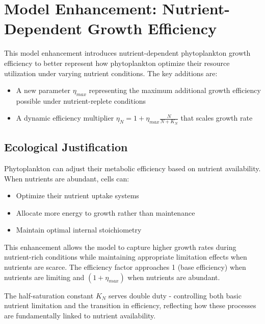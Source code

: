 \section{Model Enhancement: Nutrient-Dependent Growth Efficiency}

This model enhancement introduces nutrient-dependent phytoplankton growth efficiency to better represent how phytoplankton optimize their resource utilization under varying nutrient conditions. The key additions are:

\begin{itemize}
    \item A new parameter $\eta_{max}$ representing the maximum additional growth efficiency possible under nutrient-replete conditions
    \item A dynamic efficiency multiplier $\eta_N = 1 + \eta_{max} \frac{N}{N + K_N}$ that scales growth rate
\end{itemize}

\subsection{Ecological Justification}

Phytoplankton can adjust their metabolic efficiency based on nutrient availability. When nutrients are abundant, cells can:
\begin{itemize}
    \item Optimize their nutrient uptake systems
    \item Allocate more energy to growth rather than maintenance
    \item Maintain optimal internal stoichiometry
\end{itemize}

This enhancement allows the model to capture higher growth rates during nutrient-rich conditions while maintaining appropriate limitation effects when nutrients are scarce. The efficiency factor approaches 1 (base efficiency) when nutrients are limiting and $(1 + \eta_{max})$ when nutrients are abundant.

The half-saturation constant $K_N$ serves double duty - controlling both basic nutrient limitation and the transition in efficiency, reflecting how these processes are fundamentally linked to nutrient availability.
